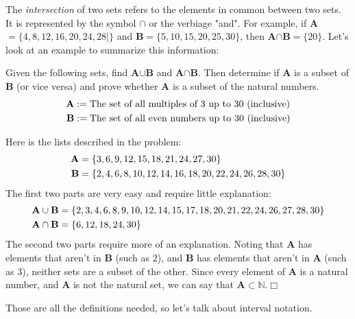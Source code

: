 \documentclass[../book.tex]{subfiles}
\begin{document}
The \textit{intersection} of two sets refers to the elements in common between two sets.  It is represented by the symbol $\cap$ or the verbiage "and".  For example, if \textbf{A}$=\{4,8, 12,16,20,24,28|\}$ and \textbf{B}$=\{5,10,15,20,25,30\}$, then \textbf{A}$\cap$\textbf{B}$=\{20\}$.
Let's look at an example to summarize this information:
\begin{example}
Given the following sets, find \textbf{A}$\cup$\textbf{B} and \textbf{A}$\cap$\textbf{B}.  Then determine if \textbf{A} is a subset of \textbf{B} (or vice versa) and prove whether \textbf{A} is a subset of the natural numbers.  \begin{align*}
    \text{\textbf{A}}&:=\text{The set of all multiples of 3 up to 30 (inclusive)} \\
    \text{\textbf{B}}&:=\text{The set of all even numbers up to 30 (inclusive)}
\end{align*}
\end{example}
\begin{solution}
Here is the lists described in the problem: \begin{align*}
    \text{\textbf{A}}&=\{3,6,9,12,15,18,21,24,27,30\} \\
    \text{\textbf{B}}&=\{2,4,6,8,10,12,14,16,18,20,22,24,26,28,30\}
\end{align*}
The first two parts are very easy and require little explanation: \begin{align*}
\text{\textbf{A}}\cup\text{\textbf{B}}&=\{2,3,4,6,8,9,10,12,14,15,17,18,20,21,22,24,26,27,28,30\} \\
\text{\textbf{A}}\cap\text{\textbf{B}}&=\{6,12,18,24,30\}
\end{align*}
The second two parts require more of an explanation.  Noting that \textbf{A} has elements that aren't in \textbf{B} (such as $2$), and \textbf{B} has elements that aren't in \textbf{A} (such as $3$), neither sets are a subset of the other.  Since every element of \textbf{A} is a natural number, and \textbf{A} is not the natural set, we can say that \textbf{A}$\subset\mathbb{N}$.$\Box$
\end{solution}
\noindent Those are all the definitions needed, so let's talk about interval notation.
\end{document}
